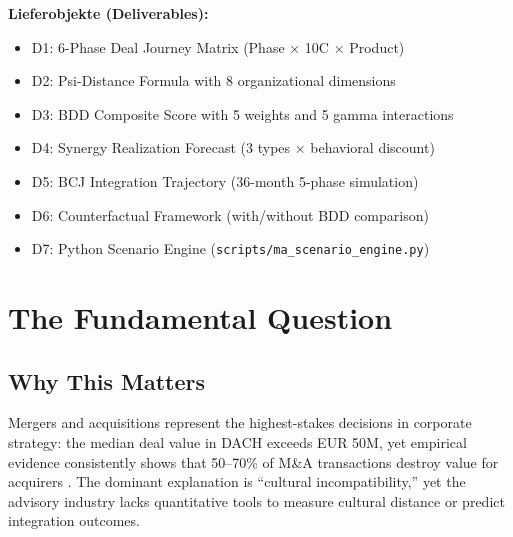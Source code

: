 \begin{tcolorbox}[
    colback=orange!5!white,
    colframe=orange!75!black,
    title={\textbf{Appendix Scope: Ziel / In-Scope / Out-of-Scope / Constraints}},
    fonttitle=\bfseries
]
\textbf{Lieferobjekte (Deliverables):}
\begin{itemize}[nosep]
    \item D1: 6-Phase Deal Journey Matrix (Phase $\times$ 10C $\times$ Product)
    \item D2: Psi-Distance Formula with 8 organizational dimensions
    \item D3: BDD Composite Score with 5 weights and 5 gamma interactions
    \item D4: Synergy Realization Forecast (3 types $\times$ behavioral discount)
    \item D5: BCJ Integration Trajectory (36-month 5-phase simulation)
    \item D6: Counterfactual Framework (with/without BDD comparison)
    \item D7: Python Scenario Engine (\texttt{scripts/ma\_scenario\_engine.py})
\end{itemize}

\end{tcolorbox}


\section{The Fundamental Question}
\label{sec:ma-fundamental}

\subsection{Why This Matters}

Mergers and acquisitions represent the highest-stakes decisions in corporate
strategy: the median deal value in DACH exceeds EUR 50M, yet empirical evidence
consistently shows that 50--70\% of M\&A transactions destroy value for acquirers
\citep{king2004meta}. The dominant explanation is ``cultural incompatibility,''
yet the advisory industry lacks quantitative tools to measure cultural distance
or predict integration outcomes.

